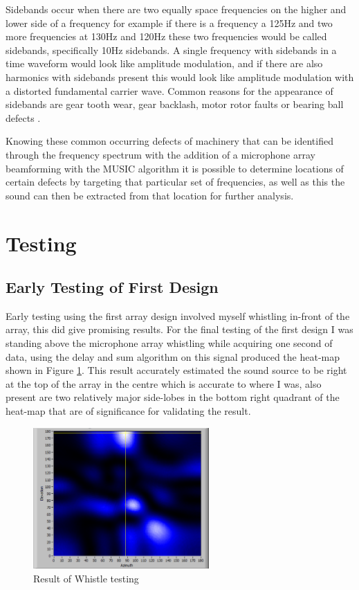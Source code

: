 \documentclass{UoNMCHA}
\numberwithin{equation}{section}
\begin{document}
Sidebands occur when there are two equally space frequencies on the higher and lower side of a frequency for example if there is a frequency a 125Hz and two more frequencies at 130Hz and 120Hz these two frequencies would be called sidebands, specifically 10Hz sidebands. A single frequency with sidebands in a time waveform would look like amplitude modulation, and if there are also harmonics with sidebands present this would look like amplitude modulation with a distorted fundamental carrier wave. Common reasons for the appearance of sidebands are gear tooth wear, gear backlash, motor rotor faults or bearing ball defects \citep{Mob20}.

Knowing these common occurring defects of machinery that can be identified through the frequency spectrum with the addition of a microphone array beamforming with the MUSIC algorithm it is possible to determine locations of certain defects by targeting that particular set of frequencies, as well as this the sound can then be extracted from that location for further analysis. 

\newpage
\section{Testing} \label{sec:Lab Testing}
\subsection{Early Testing of First Design} \label{sec:First Array Testing}
    Early testing using the first array design involved myself whistling in-front of the array, this did give promising results. For the final testing of the first design I was standing above the microphone array whistling while acquiring one second of data, using the delay and sum algorithm on this signal produced the heat-map shown in Figure \ref{fig:RealWhistle}. This result accurately estimated the sound source to be right at the top of the array in the centre which is accurate to where I was, also present are two relatively major side-lobes in the bottom right quadrant of the heat-map that are of significance for validating the result.
    
    \begin{figure} [H]
        \centering
        \includegraphics[keepaspectratio, width = 0.6\textwidth]{Figures/RealWhistle.png}
        \caption{Result of Whistle testing}
        \label{fig:RealWhistle}
    \end{figure}
    
\end{document}
